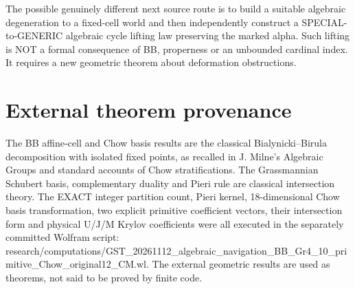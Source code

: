 \documentclass[11pt]{article}
\begin{document}
The possible genuinely different
next source route is to build
a suitable algebraic degeneration
to a fixed-cell world and then
independently construct a
SPECIAL-to-GENERIC algebraic cycle
lifting law preserving the marked
alpha. Such lifting is NOT a
formal consequence of BB, properness
or an unbounded cardinal index.
It requires a new geometric theorem
about deformation obstructions.

\section{External theorem provenance}
The BB affine-cell and Chow basis
results are the classical
Bialynicki--Birula decomposition
with isolated fixed points, as
recalled in J. Milne's Algebraic Groups
and standard accounts of Chow
stratifications. The Grassmannian
Schubert basis, complementary
duality and Pieri rule are classical
intersection theory.
The EXACT integer partition count,
Pieri kernel, 18-dimensional
Chow basis transformation,
two explicit primitive coefficient
vectors, their intersection form
and physical U/J/M Krylov
coefficients were all executed
in the separately committed
Wolfram script:
research/computations/GST_20261112_algebraic_navigation_BB_Gr4_10_primitive_Chow_original12_CM.wl.
The external geometric results are
used as theorems, not said to be
proved by finite code.
\end{document}
